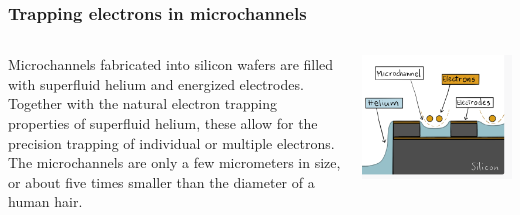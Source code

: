 \documentclass{beamer}
\begin{document}
\frame
    {
      \frametitle{Trapping electrons in microchannels}
	
      \begin{footnotesize}
     \begin{columns}
       \column{5.0cm}
Microchannels fabricated into silicon wafers are filled with superfluid helium and energized electrodes. Together with the natural electron trapping properties of superfluid helium, these allow for the precision trapping of individual or multiple electrons. The microchannels are only a few micrometers in size, or about five times smaller than the diameter of a human hair.
\column{5cm}
      \begin{center}
	\includegraphics[width=1.2\textwidth]{qcfigures/nordicquantumfig2.png}
      \end{center}
\end{columns}
      \end{footnotesize}
    }
\end{document}
